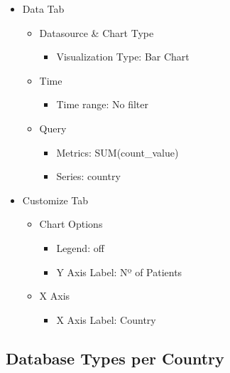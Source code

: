 \documentclass[
]{book}
\providecommand{\tightlist}{%
  \setlength{\itemsep}{0pt}\setlength{\parskip}{0pt}}
\begin{document}
\begin{itemize}
\tightlist
\item
  Data Tab

  \begin{itemize}
  \tightlist
  \item
    Datasource \& Chart Type

    \begin{itemize}
    \tightlist
    \item
      Visualization Type: Bar Chart
    \end{itemize}
  \item
    Time

    \begin{itemize}
    \tightlist
    \item
      Time range: No filter
    \end{itemize}
  \item
    Query

    \begin{itemize}
    \tightlist
    \item
      Metrics: SUM(count\_value)
    \item
      Series: country
    \end{itemize}
  \end{itemize}
\item
  Customize Tab

  \begin{itemize}
  \tightlist
  \item
    Chart Options

    \begin{itemize}
    \tightlist
    \item
      Legend: off
    \item
      Y Axis Label: Nº of Patients
    \end{itemize}
  \item
    X Axis

    \begin{itemize}
    \tightlist
    \item
      X Axis Label: Country
    \end{itemize}
  \end{itemize}
\end{itemize}

\hypertarget{database-types-per-country-1}{%
\subsection*{Database Types per Country}\label{database-types-per-country-1}}
\end{document}
